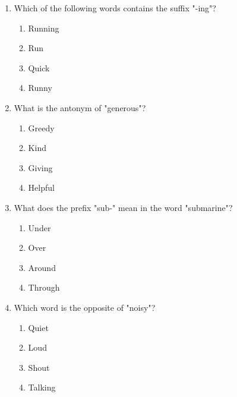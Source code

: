 \documentclass[12pt]{article}
\begin{document}
\begin{enumerate}
    \vspace{0.5cm}

    \item Which of the following words contains the suffix "-ing"?

    \begin{enumerate}[label=\Alph*.]
        \item Running
        \item Run
        \item Quick
        \item Runny
    \end{enumerate}
    
    \vspace{0.5cm}

    \item What is the antonym of "generous"?

    \begin{enumerate}[label=\Alph*.]
        \item Greedy
        \item Kind
        \item Giving
        \item Helpful
    \end{enumerate}
    
    \vspace{0.5cm}

    \item What does the prefix "sub-" mean in the word "submarine"?

    \begin{enumerate}[label=\Alph*.]
        \item Under
        \item Over
        \item Around
        \item Through
    \end{enumerate}
    
    \vspace{0.5cm}

    \item Which word is the opposite of "noisy"?

    \begin{enumerate}[label=\Alph*.]
        \item Quiet
        \item Loud
        \item Shout
        \item Talking
    \end{enumerate}
    

\end{enumerate}
\end{document}
